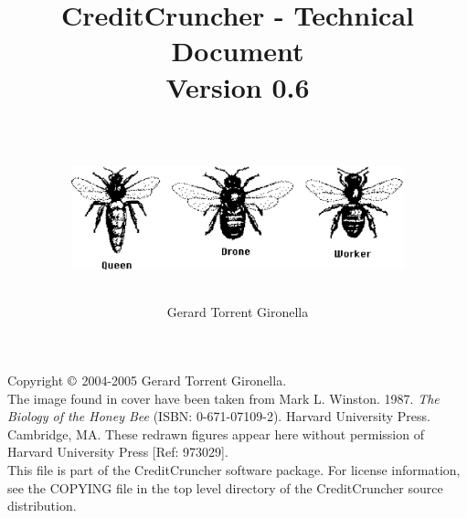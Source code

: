 
%
%
%
%
%
%
%
%

\title{CreditCruncher - Technical Document \\
Version 0.6 \\
\ \\
\centerline{\includegraphics[height=3cm, angle=0]{./images/threebees.eps}}
}

\author{Gerard Torrent Gironella}

\maketitle

\thispagestyle{empty}

\newpage

\vspace*{6in}

\noindent Copyright $\copyright$ 2004-2005 Gerard Torrent Gironella.\\

\noindent The image found in cover have been taken from Mark L. Winston. 1987. 
\emph{The Biology of the Honey Bee} (ISBN: 0-671-07109-2). Harvard University 
Press. Cambridge, MA. These redrawn figures appear here without permission of 
Harvard University Press [Ref: 973029].\\

\noindent This file is part of the CreditCruncher software package.  For
license information, see the COPYING file in the top level directory
of the CreditCruncher source distribution.
